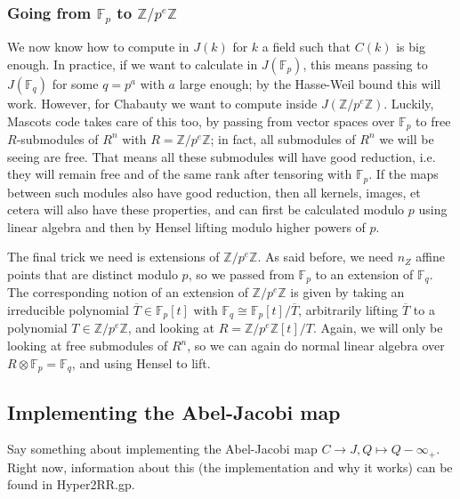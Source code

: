 \documentclass{article}
\newcommand{\Z}{\mathbb{Z}}
\newcommand{\F}{\mathbb{F}}
\newcommand{\tensor}{\otimes}
\theoremstyle{plain}
\theoremstyle{definition}
\theoremstyle{remark}
\begin{document}
\subsubsection{Going from \texorpdfstring{$\F_p$}{Fp} to \texorpdfstring{$\Z/p^e\Z$}{Z/peZ}}
We now know how to compute in $J(k)$ for $k$ a field such that $C(k)$ is big enough. In practice, if we want to calculate in $J(\F_p)$, this means passing to $J(\F_q)$ for some $q = p^a$ with $a$ large enough; by the Hasse-Weil bound this will work. However, for Chabauty we want to compute inside $J(\Z/p^e\Z)$. Luckily, Mascots code takes care of this too, by passing from vector spaces over $\F_p$ to free $R$-submodules of $R^n$ with $R = \Z/p^e\Z$; in fact, all submodules of $R^n$ we will be seeing are free. That means all these submodules will have good reduction, i.e. they will remain free and of the same rank after tensoring with $\F_p$. If the maps between such modules also have good reduction, then all kernels, images, et cetera will also have these properties, and can first be calculated modulo $p$ using linear algebra and then by Hensel lifting modulo higher powers of $p$.

The final trick we need is extensions of $\Z/p^e\Z$. As said before, we need $n_Z$ affine points that are distinct modulo $p$, so we passed from $\F_p$ to an extension of $\F_q$. The corresponding notion of an extension of $\Z/p^e\Z$ is given by taking an irreducible polynomial $\overline{T} \in \F_p[t]$ with $\F_q \cong \F_p[t]/\overline{T}$, arbitrarily lifting $\overline{T}$ to a polynomial $T \in \Z/p^e\Z$, and looking at $R = \Z/p^e\Z[t]/T$. Again, we will only be looking at free submodules of $R^n$, so we can again do normal linear algebra over $R \tensor \F_p = \F_q$, and using Hensel to lift.

\subsection{Implementing the Abel-Jacobi map}
Say something about implementing the Abel-Jacobi map $C \to J, Q \mapsto Q - \infty_+$. Right now, information about this (the implementation and why it works) can be found in Hyper2RR.gp.
\end{document}

